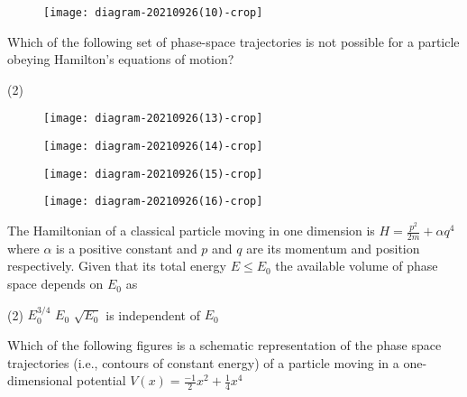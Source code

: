 \begin{enumerate}
\begin{tasks}
\begin{figure}[H]
		\centering
		\texttt{[image: diagram-20210926(10)-crop]}
	\end{figure}
\end{tasks}
\begin{minipage}{\textwidth}
	\item Which of the following set of phase-space trajectories is not possible for a particle obeying Hamilton's equations of motion?
\end{minipage}
\begin{tasks}(2)
	\task[\textbf{A.}]\begin{figure}[H]
		\centering
		\texttt{[image: diagram-20210926(13)-crop]}
	\end{figure}
	\task[\textbf{B.}]\begin{figure}[H]
		\centering
		\texttt{[image: diagram-20210926(14)-crop]}
	\end{figure}
	\task[\textbf{C.}]\begin{figure}[H]
		\centering
		\texttt{[image: diagram-20210926(15)-crop]}
	\end{figure}
	\task[\textbf{D.}]\begin{figure}[H]
		\centering
		\texttt{[image: diagram-20210926(16)-crop]}
	\end{figure}
\end{tasks}
\begin{minipage}{\textwidth}
	\item The Hamiltonian of a classical particle moving in one dimension is $H=\frac{p^{2}}{2 m}+\alpha q^{4}$ where $\alpha$ is a positive constant and $p$ and $q$ are its momentum and position respectively. Given that its total energy $E \leq E_{0}$ the available volume of phase space depends on $E_{0}$ as
\end{minipage}
\begin{tasks}(2)
	\task[\textbf{A.}] $E_{0}^{3 / 4}$
	\task[\textbf{B.}]$E_{0}$
	\task[\textbf{C.}]$\sqrt{E_{0}}$
	\task[\textbf{D.}]is independent of $E_{0}$
\end{tasks}
\begin{minipage}{\textwidth}
	\item Which of the following figures is a schematic representation of the phase space trajectories (i.e., contours of constant energy) of a particle moving in a one-dimensional potential $V(x)=\frac{-1}{2} x^{2}+\frac{1}{4} x^{4}$
\end{minipage}

\end{enumerate}
